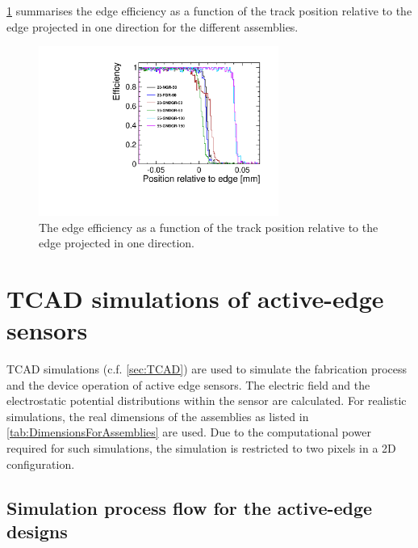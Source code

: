 \cref{fig:EdgeEff_2D} summarises the edge efficiency as a function of
the track position relative to the edge projected in one direction for
the different assemblies.

\begin{figure}[htbp]
  \centering
  \includegraphics[width=0.7\textwidth]{figures/ActiveEdge/edgeEff_2D.pdf}
  \caption{The edge efficiency as a function of the track position
    relative to the edge projected in one direction.}
  \label{fig:EdgeEff_2D}
\end{figure}

\newpage
\section{TCAD simulations of active-edge sensors}

TCAD simulations (c.f. \cref{sec:TCAD}) are used to simulate the
fabrication process and the device operation of active edge
sensors. The electric field and the electrostatic potential
distributions within the sensor are calculated. For realistic
simulations, the real dimensions of the assemblies as listed in
\cref{tab:DimensionsForAssemblies} are used. Due to the computational
power required for such simulations, the simulation is restricted to
two pixels in a 2D configuration.


\subsection{Simulation process flow for the active-edge designs}\label{sec:processFlow}


